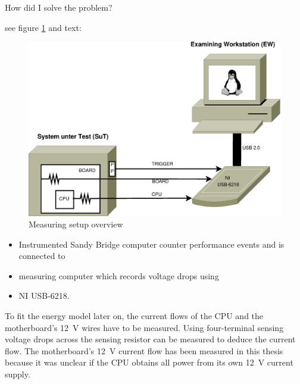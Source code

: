 \label{sec:design}

How did I solve the problem?



\label{sec:big-pic}

see figure \ref{fig:overview} and text:

\begin{figure}
  \centering
    \includegraphics[width=\textwidth]{fig/measuring-overview.eps}
  \caption{Measuring setup overview}
  \label{fig:overview}
\end{figure}

\begin{itemize}

\item Instrumented Sandy Bridge computer counter performance events and is 
      connected to

\item measuring computer which records voltage drops using

\item NI USB-6218.

\end{itemize}

\label{sec:measuring-setup}

To fit the energy model later on, the current flows of the CPU and the
motherboard's \SI{12}{\volt} wires have to be measured. Using four-terminal
sensing \cite{wiki:FTS} voltage drops across the sensing resistor can be
measured to deduce the current flow. The motherboard's \SI{12}{\volt} current
flow has been measured in this thesis because it was unclear if the CPU obtains
all power from its own \SI{12}{\volt} current supply.

